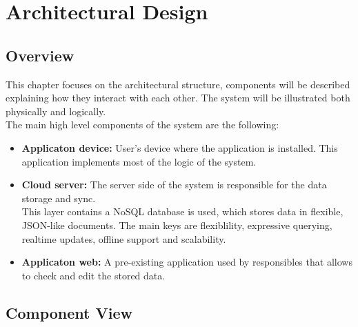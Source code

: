 \chapter{Architectural Design}
\section{Overview}
This chapter focuses on the architectural structure, components will be described explaining how they interact with each other.
The system will be illustrated both physically and logically.\\
The main high level components of the system are the following:\\
\begin{itemize}
    \item
    \textbf{Applicaton device:} User's device where the application is installed. This application implements most of the logic of the system.
    \item
    \textbf{Cloud server:}  The server side of the system is responsible for the data storage and sync.\\ This layer contains a NoSQL database is used, 
    which stores data in flexible, JSON-like documents. The main keys are flexiblility, expressive querying, realtime updates, offline support and scalability.\\
    \item
    \textbf{Applicaton web:} A pre-existing application used by responsibles that allows to check and edit the stored data.
\end{itemize}
\clearpage
\section{Component View}

